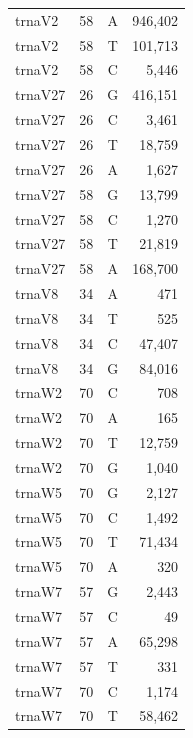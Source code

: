 \documentclass[12pt]{rockefeller}
\begin{document}
{\begin{center}
\begin{supertabular}{|l|r|c|r|}
  trnaV2 &        58 &          A &    946,402 \\
  trnaV2 &        58 &          T &    101,713 \\
  trnaV2 &        58 &          C &      5,446 \\
 trnaV27 &        26 &          G &    416,151 \\
 trnaV27 &        26 &          C &      3,461 \\
 trnaV27 &        26 &          T &     18,759 \\
 trnaV27 &        26 &          A &      1,627 \\
 trnaV27 &        58 &          G &     13,799 \\
 trnaV27 &        58 &          C &      1,270 \\
 trnaV27 &        58 &          T &     21,819 \\
 trnaV27 &        58 &          A &    168,700 \\
  trnaV8 &        34 &          A &        471 \\
  trnaV8 &        34 &          T &        525 \\
  trnaV8 &        34 &          C &     47,407 \\
  trnaV8 &        34 &          G &     84,016 \\
  trnaW2 &        70 &          C &        708 \\
  trnaW2 &        70 &          A &        165 \\
  trnaW2 &        70 &          T &     12,759 \\
  trnaW2 &        70 &          G &      1,040 \\
  trnaW5 &        70 &          G &      2,127 \\
  trnaW5 &        70 &          C &      1,492 \\
  trnaW5 &        70 &          T &     71,434 \\
  trnaW5 &        70 &          A &        320 \\
  trnaW7 &        57 &          G &      2,443 \\
  trnaW7 &        57 &          C &         49 \\
  trnaW7 &        57 &          A &     65,298 \\
  trnaW7 &        57 &          T &        331 \\
  trnaW7 &        70 &          C &      1,174 \\
  trnaW7 &        70 &          T &     58,462 \\

\end{supertabular}
\end{center}}
\end{document}
